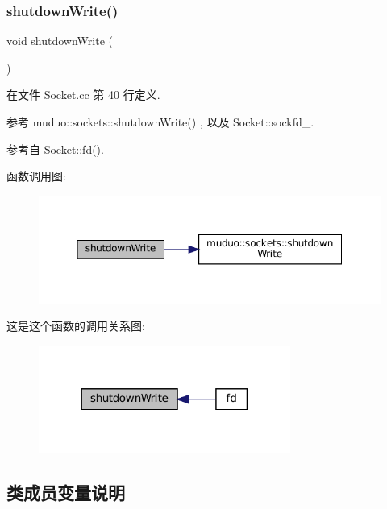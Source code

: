 \subsubsection{\texorpdfstring{shutdown\+Write()}{shutdownWrite()}}
{\footnotesize\ttfamily void shutdown\+Write (\begin{DoxyParamCaption}{ }\end{DoxyParamCaption})}



在文件 Socket.\+cc 第 40 行定义.



参考 muduo\+::sockets\+::shutdown\+Write() , 以及 Socket\+::sockfd\+\_\+.



参考自 Socket\+::fd().

函数调用图\+:
\nopagebreak
\begin{figure}[H]
\begin{center}
\leavevmode
\includegraphics[width=350pt]{classmuduo_1_1Socket_a214a4d8c48e77393446932b95ebdf306_cgraph}
\end{center}
\end{figure}
这是这个函数的调用关系图\+:
\nopagebreak
\begin{figure}[H]
\begin{center}
\leavevmode
\includegraphics[width=234pt]{classmuduo_1_1Socket_a214a4d8c48e77393446932b95ebdf306_icgraph}
\end{center}
\end{figure}


\subsection{类成员变量说明}
\mbox{\label{classmuduo_1_1Socket_ad56487222e0d1634d397b788af212ffa}} 
